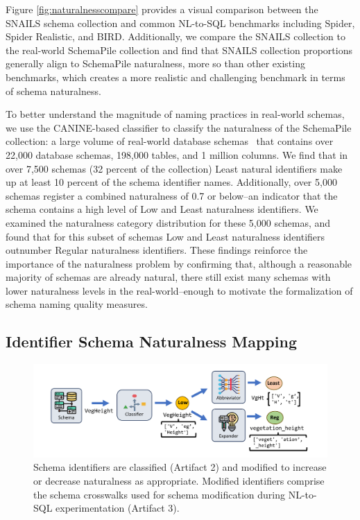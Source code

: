 Figure \ref{fig:naturalnesscompare} provides a visual comparison between the SNAILS schema collection and common NL-to-SQL benchmarks including Spider, Spider Realistic, and BIRD.
Additionally, we compare the SNAILS collection to the real-world SchemaPile collection and find that SNAILS collection proportions generally align to SchemaPile naturalness, more so than other existing benchmarks, which creates a more realistic and challenging benchmark in terms of schema naturalness.

To better understand the magnitude of naming practices in real-world schemas,
we use the CANINE-based classifier to classify the naturalness of the SchemaPile collection: a large volume of real-world database schemas~\cite{doehmen2024schemapile} that contains over 22,000 database schemas, 198,000 tables, and 1 million columns.
We find that in over 7,500 schemas (32 percent of the collection) Least natural identifiers make up at least 10 percent of the schema identifier names.
Additionally, over 5,000 schemas register a combined naturalness of 0.7 or below--an indicator that the schema contains a high level of Low and Least naturalness identifiers.
We examined the naturalness category distribution for these 5,000 schemas, and found that for this subset of schemas Low and Least naturalness identifiers outnumber Regular naturalness identifiers.
These findings reinforce the importance of the naturalness problem by confirming that, although a reasonable majority of schemas are already natural, there still exist many schemas with lower naturalness levels in the real-world--enough to motivate the formalization of schema naming quality measures.


\subsection{Identifier Schema Naturalness Mapping}
\label{subsection:naturalnessmapping}

\begin{figure}
    \centering
    \includegraphics[width=\linewidth]{figures/classify-modify-pipeline.pdf}
    \caption{Schema identifiers are classified (Artifact 2) and modified to increase or decrease naturalness as appropriate. Modified identifiers comprise the schema crosswalks used for schema modification during NL-to-SQL experimentation (Artifact 3).}
    \label{fig:classify-modify-pipeline-main}
\end{figure}

